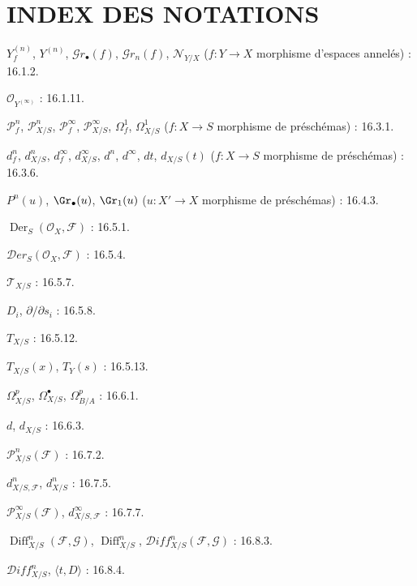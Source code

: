 \clearpage
{}
{}
\section*{INDEX DES NOTATIONS}

\begingroup
\small
\setlength{\parindent}{0pt}
\setlength{\parskip}{1.5pt}

$Y_f^{(n)}$, $Y^{(n)}$, $\mathcal{G}r_{\bullet}(f)$,
$\mathcal{G}r_n(f)$, $\mathcal{N}_{Y/X}$
($f:Y\to X$ morphisme d'espaces annelés) : 16.1.2.

$\mathcal{O}_{Y^{(\infty)}}$ : 16.1.11.

$\mathcal{P}^{n}_{f}$, $\mathcal{P}^{n}_{X/S}$,
$\mathcal{P}^{\infty}_{f}$, $\mathcal{P}^{\infty}_{X/S}$,
$\Omega^{1}_{f}$, $\Omega^{1}_{X/S}$
($f:X\to S$ morphisme de préschémas) : 16.3.1.

$d^{n}_{f}$, $d^{n}_{X/S}$, $d^{\infty}_{f}$,
$d^{\infty}_{X/S}$, $d^{n}$, $d^{\infty}$, $dt$, $d_{X/S}(t)$
($f:X\to S$ morphisme de préschémas) : 16.3.6.

$P^{n}(u)$, $\Gr_{\bullet}(u)$, $\Gr_{1}(u)$
($u:X'\to X$ morphisme de préschémas) : 16.4.3.

$\operatorname{Der}_{S}(\mathcal{O}_{X},\mathcal{F})$ : 16.5.1.

$\mathcal{D}er_{S}(\mathcal{O}_{X},\mathcal{F})$ : 16.5.4.

$\mathcal{T}_{X/S}$ : 16.5.7.

$D_i$, $\partial/\partial s_i$ : 16.5.8.

$T_{X/S}$ : 16.5.12.

$T_{X/S}(x)$, $T_Y(s)$ : 16.5.13.

$\Omega^p_{X/S}$, $\Omega^\bullet_{X/S}$, $\Omega^p_{B/A}$ : 16.6.1.

$d$, $d_{X/S}$ : 16.6.3.

$\mathcal{P}^n_{X/S}(\mathcal{F})$ : 16.7.2.

$d^n_{X/S,\mathcal{F}}$, $d^n_{X/S}$ : 16.7.5.

$\mathcal{P}^{\infty}_{X/S}(\mathcal{F})$,
$d^{\infty}_{X/S,\mathcal{F}}$ : 16.7.7.

$\operatorname{Diff}^{n}_{X/S}(\mathcal{F},\mathcal{G})$,
$\operatorname{Diff}^{n}_{X/S}$,
$\mathcal{D}iff^{n}_{X/S}(\mathcal{F},\mathcal{G})$ : 16.8.3.

$\mathcal{D}iff^{n}_{X/S}$, $\langle t,D\rangle$ : 16.8.4.

